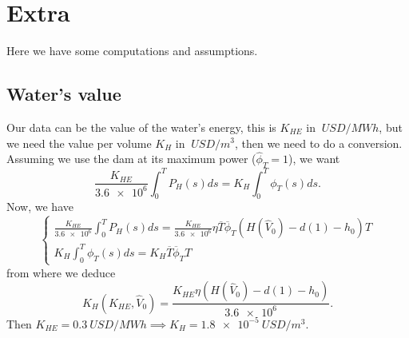 \documentclass[12pt]{article}
\theoremstyle{definition}
\theoremstyle{remark}
\begin{document}


\section{Extra}

Here we have some computations and assumptions.

\subsection{Water's value}

Our data can be the value of the water's energy, this is $K_{HE}$ in $\SI{}{USD/MWh}$, but we need the value per volume $K_H$ in $\SI{}{USD/m^3}$, then we need to do a conversion. Assuming we use the dam at its maximum power ($\hat{\phi}_T=1$), we want
\begin{equation*}
\frac{K_{HE}}{\num{3.6e6}}\int_0^TP_H(s)ds=K_H\int_0^T\phi_T(s)ds.
\end{equation*}
Now, we have
\begin{equation*}
\begin{cases}
\frac{K_{HE}}{\num{3.6e6}}\int_0^TP_H(s)ds=\frac{K_{HE}}{\num{3.6e6}}\eta\overline{T}\overline{\phi}_T(H(\hat{V}_0)-d(1)-h_0)T\\
K_H\int_0^T\phi_T(s)ds=K_H\overline{T}\overline{\phi}_TT
\end{cases}
\end{equation*}
from where we deduce
\begin{equation*}
K_H(K_{HE},\hat{V}_0)=\frac{K_{HE}\eta(H(\hat{V}_0)-d(1)-h_0)}{\num{3.6e6}}.
\end{equation*}
Then $K_{HE}=\SI{0.3}{USD/MWh}\implies K_H=\SI{1.8e-5}{USD/m^3}$.
\end{document}
